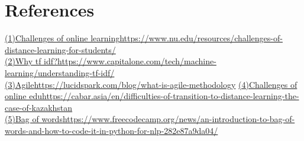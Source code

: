 \chapter{References}\label{ch:Ref}
\href{https://www.nu.edu/resources/challenges-of-distance-learning-for-students/}{(1)Challenges of online learning}\tab \url{https://www.nu.edu/resources/challenges-of-distance-learning-for-students/}\\
\href{https://www.capitalone.com/tech/machine-learning/understanding-tf-idf/}{(2)Why tf idf?}\tab \url{https://www.capitalone.com/tech/machine-learning/understanding-tf-idf/}\\
\href{https://lucidspark.com/blog/what-is-agile-methodology }{(3)Agile}\tab \url{https://lucidspark.com/blog/what-is-agile-methodology}
\href{https://cabar.asia/en/difficulties-of-transition-to-distance-learning-the-case-of-kazakhstan}{(4)Challenges of online edu}\tab \url{https://cabar.asia/en/difficulties-of-transition-to-distance-learning-the-case-of-kazakhstan}\\
\href{https://www.freecodecamp.org/news/an-introduction-to-bag-of-words-and-how-to-code-it-in-python-for-nlp-282e87a9da04/}{(5)Bag of words}\tab \url{https://www.freecodecamp.org/news/an-introduction-to-bag-of-words-and-how-to-code-it-in-python-for-nlp-282e87a9da04/}


